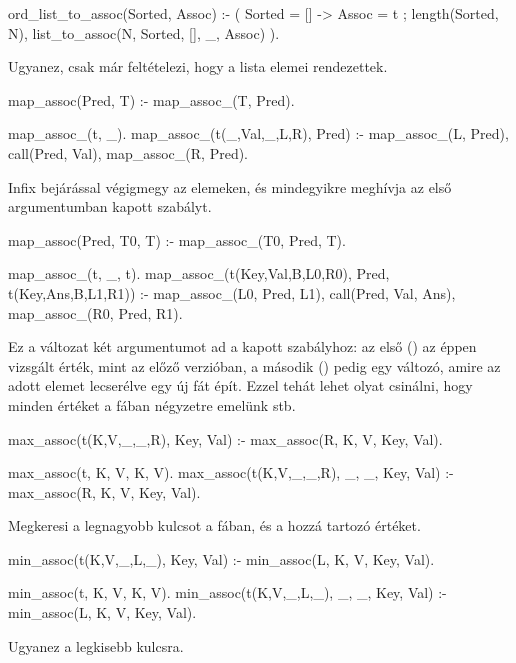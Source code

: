 \begin{program*}
ord_list_to_assoc(Sorted, Assoc) :-
    (  Sorted = [] -> Assoc = t
    ;  length(Sorted, N),
       list_to_assoc(N, Sorted, [], _, Assoc)
    ).
\end{program*}
Ugyanez, csak már feltételezi, hogy a lista elemei
rendezettek.

\begin{program*}
map_assoc(Pred, T) :-
    map_assoc_(T, Pred).

map_assoc_(t, _).
map_assoc_(t(_,Val,_,L,R), Pred) :-
    map_assoc_(L, Pred),
    call(Pred, Val),
    map_assoc_(R, Pred).
\end{program*}
Infix bejárással végigmegy az elemeken, és
mindegyikre meghívja az első argumentumban kapott
szabályt.

\begin{program*}
map_assoc(Pred, T0, T) :-
    map_assoc_(T0, Pred, T).

map_assoc_(t, _, t).
map_assoc_(t(Key,Val,B,L0,R0), Pred,
           t(Key,Ans,B,L1,R1)) :-
    map_assoc_(L0, Pred, L1),
    call(Pred, Val, Ans),
    map_assoc_(R0, Pred, R1).
\end{program*}
Ez a változat két argumentumot ad a kapott
szabályhoz: az első () az éppen vizsgált
érték, mint az előző verzióban, a második ()
pedig egy változó, amire az adott elemet lecserélve
egy új fát épít. Ezzel tehát lehet olyat csinálni,
hogy minden értéket a fában négyzetre emelünk stb.

\begin{program*}
max_assoc(t(K,V,_,_,R), Key, Val) :-
    max_assoc(R, K, V, Key, Val).

max_assoc(t, K, V, K, V).
max_assoc(t(K,V,_,_,R), _, _, Key, Val) :-
    max_assoc(R, K, V, Key, Val).
\end{program*}
Megkeresi a legnagyobb kulcsot a fában, és a hozzá
tartozó értéket.

\begin{program*}
min_assoc(t(K,V,_,L,_), Key, Val) :-
    min_assoc(L, K, V, Key, Val).

min_assoc(t, K, V, K, V).
min_assoc(t(K,V,_,L,_), _, _, Key, Val) :-
    min_assoc(L, K, V, Key, Val).
\end{program*}
Ugyanez a legkisebb kulcsra.

